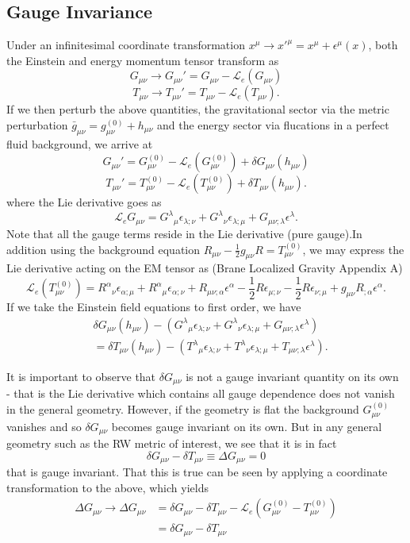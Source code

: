 \documentclass[10pt,letterpaper]{article}
\newcommand{\plr}[1]{\left(#1\right)} %
\newcommand{\be}{\begin{equation}} %
\newcommand{\ee}{\end{equation}} %
\newcommand{\ep}{\epsilon}
\numberwithin{equation}{section}
\begin{document}
\subsection{Gauge Invariance}
Under an infinitesimal coordinate transformation $x^\mu \to x'^\mu = x^\mu + \ep^\mu(x)$, both the Einstein and energy momentum tensor transform as
\be
	G_{\mu\nu} \to G_{\mu\nu}' = G_{\mu\nu} - \mathcal L_e (G_{\mu\nu})
\ee
\be
	T_{\mu\nu} \to T_{\mu\nu}' = T_{\mu\nu} - \mathcal L_e (T_{\mu\nu}).
\ee
If we then perturb the above quantities, the gravitational sector via the metric perturbation  $	\bar g_{\mu\nu} =  g^{(0)}_{\mu\nu} + h_{\mu\nu} $ and the energy sector via flucations in a perfect fluid background, we arrive at
\be
	G_{\mu\nu}' = G^{(0)}_{\mu\nu} - \mathcal L_e(G^{(0)}_{\mu\nu}) + \delta G_{\mu\nu}(h_{\mu\nu})
\ee
\be
	T_{\mu\nu}' =T^{(0)}_{\mu\nu} - \mathcal L_e(T^{(0)}_{\mu\nu}) + \delta T_{\mu\nu}(h_{\mu\nu}).
\ee
where the Lie derivative goes as
\be
	\mathcal L_e G_{\mu\nu} = G^{\lambda}{}_{\mu}\ep_{\lambda;\nu} + G^{\lambda}{}_\nu \ep_{\lambda;\mu} + G_{\mu\nu;\lambda}\ep^\lambda.
\ee
Note that all the gauge terms reside in the Lie derivative (pure gauge).In addition using the background equation $R_{\mu\nu} -\frac12 g_{\mu\nu} R = T^{(0)}_{\mu\nu}$, we may express the Lie derivative acting on the EM tensor as (Brane Localized Gravity Appendix A)
\be
	\mathcal L_e(T^{(0)}_{\mu\nu}) = R^\alpha{}_\nu \ep_{\alpha;\mu} + R^\alpha{}_\mu \ep_{\alpha;\nu} + R_{\mu\nu;\alpha}\ep^\alpha - \frac12 R \ep_{\mu;\nu} - \frac12 R\ep_{\nu;\mu} + g_{\mu\nu}R_{;\alpha}\ep^\alpha.
\ee
 If we take the Einstein field equations to first order, we have
\begin{align}
	&\delta G_{\mu\nu}(h_{\mu\nu}) 	-\plr{ G^{\lambda}{}_{\mu}\ep_{\lambda;\nu} + G^{\lambda}{}_\nu \ep_{\lambda;\mu} + G_{\mu\nu;\lambda}\ep^\lambda}\\
	&= \delta T_{\mu\nu}(h_{\mu\nu}) 	-\plr{ T^{\lambda}{}_{\mu}\ep_{\lambda;\nu} + T^{\lambda}{}_\nu \ep_{\lambda;\mu} + T_{\mu\nu;\lambda}\ep^\lambda}.
\end{align}

It is important to observe that $\delta G_{\mu\nu}$ is not a gauge invariant quantity on its own - that is the Lie derivative which contains all gauge dependence does not vanish in the general geometry. However, if the geometry is flat the background $G^{(0)}_{\mu\nu}$ vanishes and so $\delta G_{\mu\nu}$ becomes gauge invariant on its own. But in any general geometry such as the RW metric of interest, we see that it is in fact 
\be
	\delta G_{\mu\nu}- \delta T_{\mu\nu} \equiv \Delta G_{\mu\nu} = 0
\ee
that is gauge invariant. That this is true can be seen by applying a coordinate transformation to the above, which yields
\begin{align}
	\Delta G_{\mu\nu} \to \Delta G_{\mu\nu} &= \delta G_{\mu\nu} - \delta T_{\mu\nu} - \mathcal L_e (G^{(0)}_{\mu\nu} - T^{(0)}_{\mu\nu})\\
	& = \delta G_{\mu\nu} - \delta T_{\mu\nu}
\end{align}
\end{document}
